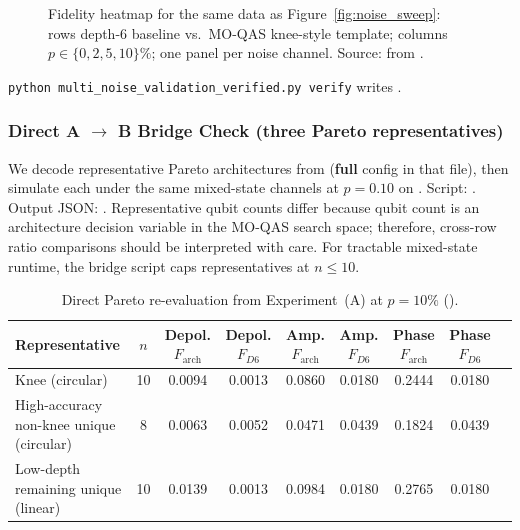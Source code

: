 \begin{figure}[t]
  \centering
  \caption{Fidelity heatmap for the same data as Figure~\ref{fig:noise_sweep}:
    rows depth-6 baseline vs.\ MO-QAS knee-style template; columns
    $p\in\{0,2,5,10\}\%$; one panel per noise channel.
    Source:  from .}
  \label{fig:fidelity_heatmap}
\end{figure}

\noindent
\texttt{python multi\_noise\_validation\_verified.py verify} writes
.

\subsubsection{Direct A $\rightarrow$ B Bridge Check (three Pareto representatives)}

We decode representative Pareto architectures from
(\textbf{full} config in that file), then simulate each under the same
mixed-state channels at $p=0.10$ on . Script:
. Output JSON:
.
Representative qubit counts differ because qubit count is an architecture
decision variable in the MO-QAS search space; therefore, cross-row ratio
comparisons should be interpreted with care. For tractable mixed-state runtime,
the bridge script caps representatives at $n\le 10$.

\begin{table}[t]
  \centering
  \caption{Direct Pareto re-evaluation from Experiment~(A) at $p=10\%$
           ().}
  \label{tab:bridge_pareto_10pct}
  \footnotesize
  \setlength{\tabcolsep}{4pt}
  \begin{tabular}{lcccccccc}
    \toprule
    Representative & $n$ &
    Depol. $F_{\text{arch}}$ & Depol. $F_{D6}$ &
    Amp. $F_{\text{arch}}$ & Amp. $F_{D6}$ &
    Phase $F_{\text{arch}}$ & Phase $F_{D6}$ \\
    \midrule
    Knee (circular) & 10 & 0.0094 & 0.0013 & 0.0860 & 0.0180 & 0.2444 & 0.0180 \\
    High-accuracy non-knee unique (circular) & 8 & 0.0063 & 0.0052 & 0.0471 & 0.0439 & 0.1824 & 0.0439 \\
    Low-depth remaining unique (linear) & 10 & 0.0139 & 0.0013 & 0.0984 & 0.0180 & 0.2765 & 0.0180 \\
    \bottomrule
  \end{tabular}
\end{table}

